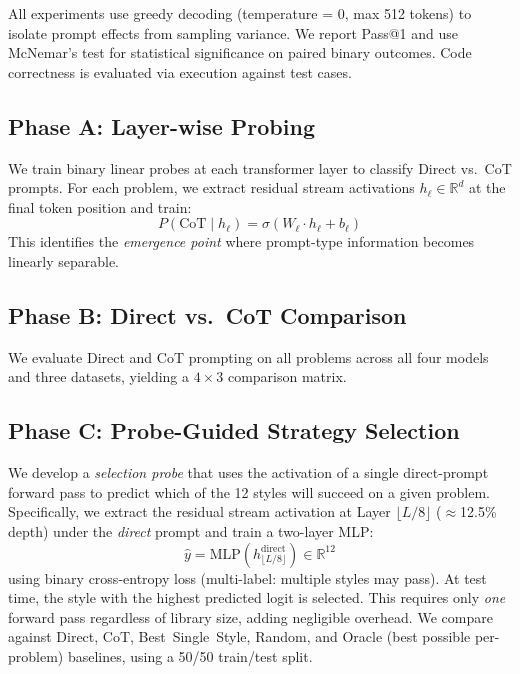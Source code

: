 \documentclass{article}
\begin{document}
All experiments use greedy decoding (temperature = 0, max 512 tokens) to isolate prompt effects from sampling variance. We report Pass@1 and use McNemar's test for statistical significance on paired binary outcomes. Code correctness is evaluated via execution against test cases.

\subsection{Phase A: Layer-wise Probing}

We train binary linear probes at each transformer layer to classify Direct vs.\ CoT prompts. For each problem, we extract residual stream activations $h_\ell \in \mathbb{R}^d$ at the final token position and train:
\begin{equation}
    P(\text{CoT} \mid h_\ell) = \sigma(W_\ell \cdot h_\ell + b_\ell)
\end{equation}
This identifies the \emph{emergence point} where prompt-type information becomes linearly separable.

\subsection{Phase B: Direct vs.\ CoT Comparison}

We evaluate Direct and CoT prompting on all problems across all four models and three datasets, yielding a $4 \times 3$ comparison matrix.

\subsection{Phase C: Probe-Guided Strategy Selection}

We develop a \emph{selection probe} that uses the activation of a single direct-prompt forward pass to predict which of the 12 styles will succeed on a given problem. Specifically, we extract the residual stream activation at Layer $\lfloor L/8 \rfloor$ ($\approx$12.5\% depth) under the \emph{direct} prompt and train a two-layer MLP:
\begin{equation}
    \hat{y} = \text{MLP}(h_{\lfloor L/8 \rfloor}^{\text{direct}}) \in \mathbb{R}^{12}
\end{equation}
using binary cross-entropy loss (multi-label: multiple styles may pass). At test time, the style with the highest predicted logit is selected. This requires only \emph{one} forward pass regardless of library size, adding negligible overhead. We compare against Direct, CoT, Best~Single~Style, Random, and Oracle (best possible per-problem) baselines, using a 50/50 train/test split.
\end{document}
